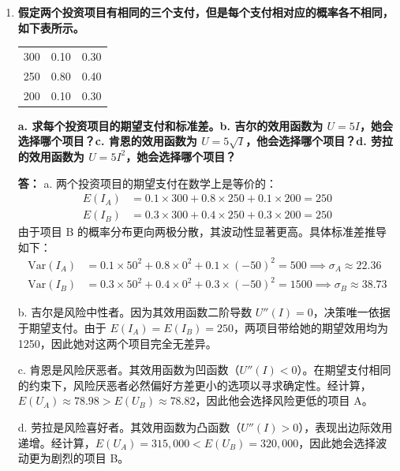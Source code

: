 \begin{enumerate}[label=\textbf{\arabic*.}, leftmargin=*]
		\item \textbf{假定两个投资项目有相同的三个支付，但是每个支付相对应的概率各不相同，如下表所示。}
		\begin{center}
			\normalfont
			\renewcommand{\arraystretch}{1.3}
			\begin{tabular}{ccc}
				\toprule
				\makebox[3cm][c]{支付（美元）} & \makebox[3cm][c]{项目 A 概率} & \makebox[3cm][c]{项目 B 概率} \\
				\midrule
				300 & 0.10 & 0.30 \\
				250 & 0.80 & 0.40 \\
				200 & 0.10 & 0.30 \\
				\bottomrule
			\end{tabular}
		\end{center}
		\textbf{a. 求每个投资项目的期望支付和标准差。b. 吉尔的效用函数为 $U=5I$，她会选择哪个项目？c. 肯恩的效用函数为 $U=5\sqrt{I}$，他会选择哪个项目？d. 劳拉的效用函数为 $U=5I^2$，她会选择哪个项目？}
		
		\textbf{答：}
		a. 两个投资项目的期望支付在数学上是等价的：
		\[
		\begin{aligned}
			E(I_A) &= 0.1 \times 300 + 0.8 \times 250 + 0.1 \times 200 = 250 \\
			E(I_B) &= 0.3 \times 300 + 0.4 \times 250 + 0.3 \times 200 = 250
		\end{aligned}
		\]
		由于项目 B 的概率分布更向两极分散，其波动性显著更高。具体标准差推导如下：
		\[
		\begin{aligned}
			\text{Var}(I_A) &= 0.1 \times 50^2 + 0.8 \times 0^2 + 0.1 \times (-50)^2 = 500 \implies \sigma_A \approx 22.36 \\
			\text{Var}(I_B) &= 0.3 \times 50^2 + 0.4 \times 0^2 + 0.3 \times (-50)^2 = 1500 \implies \sigma_B \approx 38.73
		\end{aligned}
		\]
		
		b. 吉尔是风险中性者。因为其效用函数二阶导数 $U''(I) = 0$，决策唯一依据于期望支付。由于 $E(I_A) = E(I_B) = 250$，两项目带给她的期望效用均为 1250，因此她对这两个项目完全无差异。
		
		c. 肯恩是风险厌恶者。其效用函数为凹函数（$U''(I) < 0$）。在期望支付相同的约束下，风险厌恶者必然偏好方差更小的选项以寻求确定性。经计算，$E(U_A) \approx 78.98 > E(U_B) \approx 78.82$，因此他会选择风险更低的项目 A。
		
		d. 劳拉是风险喜好者。其效用函数为凸函数（$U''(I) > 0$），表现出边际效用递增。经计算，$E(U_A) = 315,000 < E(U_B) = 320,000$，因此她会选择波动更为剧烈的项目 B。
		

\end{enumerate}
